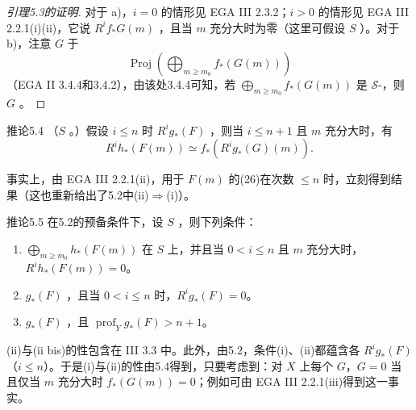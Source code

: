\begin{proof}[引理5.3的证明]
对于 a)，$i=0$ 的情形见 EGA III 2.3.2；$i>0$ 的情形见 EGA III 2.2.1(i)(ii)，它说 $R^if_*G(m)$ ，且当 $m$ 充分大时为零（这里可假设 $S$ ）。对于 b)，注意 $G$ 于
\[
 \operatorname{Proj}\left(\bigoplus_{m\geq m_0}f_*(G(m))\right)
\]
（EGA II 3.4.4和3.4.2），由该处3.4.4可知，若 $\bigoplus_{m\geq m_0}f_*(G(m))$ 是 $\mathscr S$-，则 $G$ 。
\end{proof}

\begin{SGAresult}{推论}{5.4}
（$S$ 。）假设 $i\leq n$ 时 $R^ig_*(F)$ ，则当 $i\leq n+1$ 且 $m$ 充分大时，有
\[
 R^ih_*(F(m))\simeq f_*(R^ig_*(G)(m)).
\]
\end{SGAresult}
事实上，由 EGA III 2.2.1(ii)，用于 $F(m)$ 的(26)在次数 $\leq n$ 时，立刻得到结果（这也重新给出了5.2中(ii)$\Rightarrow$(i)）。
\begin{SGAresult}{推论}{5.5}
在5.2的预备条件下，设 $S$ ，则下列条件：
\begin{enumerate}
\item[(i)] $\bigoplus_{m\geq m_0}h_*(F(m))$ 在 $S$ 上，并且当 $0<i\leq n$ 且 $m$ 充分大时，$R^ih_*(F(m))=0$。
\item[(ii)] $g_*(F)$ ，且当 $0<i\leq n$ 时，$R^ig_*(F)=0$。
\item[(ii bis)] $g_*(F)$ ，且 $\operatorname{prof}_Yg_*(F)>n+1$。
\end{enumerate}
\end{SGAresult}
(ii)与(ii bis)的性包含在 III 3.3 中。此外，由5.2，条件(i)、(ii)都蕴含各 $R^ig_*(F)$（$i\leq n$）。于是(i)与(ii)的性由5.4得到，只要考虑到：对 $X$ 上每个 $G$，$G=0$ 当且仅当 $m$ 充分大时 $f_*(G(m))=0$；例如可由 EGA III 2.2.1(iii)得到这一事实。

